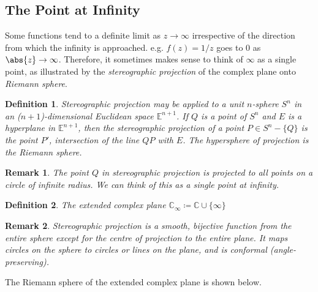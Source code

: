 \documentclass{article}
\theoremstyle{plain}\theoremheaderfont{\normalfont\itshape}\theorembodyfont{\rmfamily}\theoremseparator{.}\newtheorem*{rem}{Remark}\newtheorem*{ex}{Example}\newtheorem*{proof}{Proof}\newtheorem*{altp}{Alternative proof}
\theoremstyle{plain}\theoremheaderfont{\normalfont\bfseries}\theorembodyfont{\rmfamily}\theoremseparator{.}\newtheorem{thm}{Theorem}[section]\newtheorem{lem}[thm]{Lemma}\newtheorem{prop}[thm]{Proposition}\newtheorem*{cor}{Corollary}\newtheorem{defn}[thm]{Definition}\newtheorem{clm}[thm]{Claim}\newtheorem{clminproof}{Claim}
\theoremstyle{break}\theoremheaderfont{\normalfont\itshape}\theorembodyfont{\rmfamily}\theoremseparator{.\medskip}\newtheorem*{proofskip}{Proof}\newtheorem*{exs}{Examples}\newtheorem*{rems}{Remarks}
\theoremstyle{break}\theoremheaderfont{\normalfont\bfseries}\theorembodyfont{\rmfamily}\theoremseparator{.\medskip}\newtheorem{lemskip}[thm]{Lemma}\newtheorem{defnskip}[thm]{Definition}\newtheorem{propskip}[thm]{Proposition}\newtheorem{thmskip}[thm]{Theorem}
\numberwithin{equation}{section}
\begin{document}
	\subsection{The Point at Infinity}
	Some functions tend to a definite limit as \(z\to\infty\) irrespective of the direction from which the infinity is approached. e.g. \(f(z)=1/z\) goes to 0 as \(\abs{z}\to\infty\). Therefore, it sometimes makes sense to think of \(\infty\) as a single point, as illustrated by the \textit{stereographic projection} of the complex plane onto \textit{Riemann sphere}.
	\begin{defn}
		\textit{Stereographic projection} may be applied to a unit \(n\)-sphere \(S^n\) in an (\(n+1\))-dimensional Euclidean space \(\mathbb{E}^{n+1}\). If \(Q\) is a point of \(S^n\) and \(E\) is a hyperplane in \(\mathbb{E}^{n+1}\), then the stereographic projection of a point \(P\in S^n-\{Q\}\) is the point \(P'\), intersection of the line \(QP\) with \(E\). The hypersphere of projection is the \textit{Riemann sphere}.
	\end{defn}
	\begin{rem}
		The point \(Q\) in stereographic projection is projected to all points on a circle of infinite radius. We can think of this as a single \textit{point at infinity}.
	\end{rem}
	\begin{defn}
		The \textit{extended complex plane} \(\mathbb{C}_\infty\coloneqq\mathbb{C}\cup\{\infty\}\)
	\end{defn}
	\begin{rem}
		Stereographic projection is a smooth, bijective function from the entire sphere except for the centre of projection to the entire plane. It maps circles on the sphere to circles or lines on the plane, and is conformal (angle-preserving).
	\end{rem}

	The Riemann sphere of the extended complex plane is shown below.

	\begin{figure}[ht!]
		\centering
	\end{figure}
\end{document}
